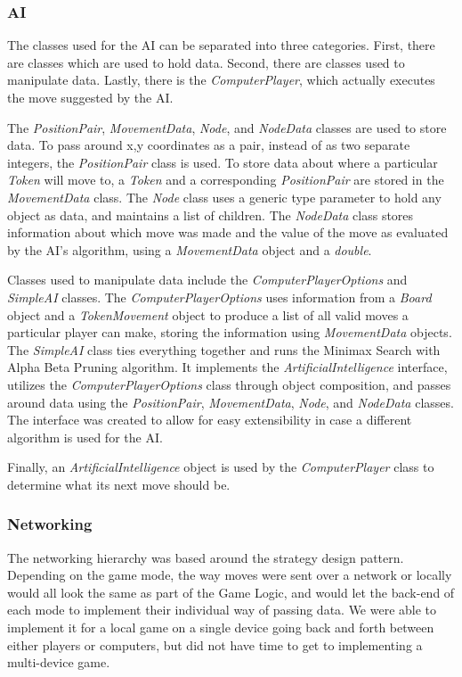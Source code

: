 \documentclass{article}
\begin{document}
\subsubsection{AI}
	The classes used for the AI can be separated into three categories. First, there are classes which are used to hold data. Second, there are classes used to manipulate data. Lastly, there is the \textit{ComputerPlayer}, which actually executes the move suggested by the AI.  \par
	The \textit{PositionPair}, \textit{MovementData}, \textit{Node}, and \textit{NodeData} classes are used to store data. To pass around x,y coordinates as a pair, instead of as two separate integers, the \textit{PositionPair} class is used. To store data about where a particular \textit{Token} will move to, a \textit{Token} and a corresponding \textit{PositionPair} are stored in the \textit{MovementData} class. The \textit{Node} class uses a generic type parameter to hold any object as data, and maintains a list of children. The \textit{NodeData} class stores information about which move was made and the value of the move as evaluated by the AI's algorithm, using a \textit{MovementData} object and a \textit{double}.\par
	Classes used to manipulate data include the \textit{ComputerPlayerOptions} and \textit{SimpleAI} classes. The \textit{ComputerPlayerOptions} uses information from a \textit{Board} object and a \textit{TokenMovement} object to produce a list of all valid moves a particular player can make, storing the information using \textit{MovementData} objects. The \textit{SimpleAI} class ties everything together and runs the Minimax Search with Alpha Beta Pruning algorithm. It implements the \textit{ArtificialIntelligence} interface, utilizes the \textit{ComputerPlayerOptions} class through object composition, and passes around data using the \textit{PositionPair}, \textit{MovementData}, \textit{Node}, and \textit{NodeData} classes. The interface was created to allow for easy extensibility in case a different algorithm is used for the AI.\par
	Finally, an \textit{ArtificialIntelligence} object is used by the \textit{ComputerPlayer} class to determine what its next move should be. 

\subsubsection{Networking}
The networking hierarchy was based around the strategy design pattern. Depending on the game mode, the way moves were sent over a network or locally would all look the same as part of the Game Logic, and would let the back-end of each mode to implement their individual way of passing data. We were able to implement it for a local game on a single device going back and forth between either players or computers, but did not have time to get to implementing a multi-device game.
\end{document}
